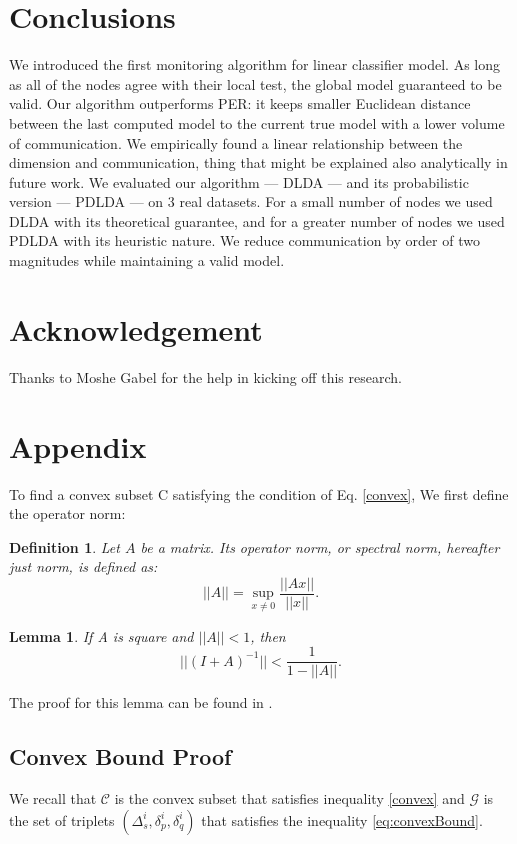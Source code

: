 \documentclass[11pt,twocolumn,varwidth=true,a4paper,fleqn]{article}
\newtheorem{lemma}{Lemma}
\newtheorem{definition}{Definition}
\begin{document}
\section*{Conclusions}
We introduced the first monitoring algorithm for linear classifier model.
As long as all of the nodes agree with their local test, the
global model guaranteed to be valid. 
Our algorithm outperforms PER: it keeps smaller Euclidean distance between 
the last computed model to the current true model with a lower volume of
communication. 
We empirically found a linear relationship between the dimension and
communication, thing that might be explained also analytically 
in future work. 
We evaluated our algorithm --- DLDA --- and its probabilistic version --- PDLDA --- on 3 real datasets. For a small number of nodes we used 
DLDA with its theoretical guarantee, and for a greater number of nodes we used
PDLDA with its heuristic nature.
We reduce communication by order of two magnitudes while maintaining a 
valid model.
 \section*{Acknowledgement}
Thanks to Moshe Gabel for the help in kicking off this research.




\appendix
\section{Appendix} \label{AppendixA}
To find a convex subset C satisfying the condition of Eq. \ref{convex},
We first define the operator norm:
\begin{definition}
Let $A$ be a matrix. Its operator norm, or
spectral norm, hereafter just norm, is defined as:
\begin{equation*}
||A|| = \sup_{x \neq 0}\frac{||Ax||}{||x||}.
\end{equation*}
\end{definition}

\begin{lemma} \label{lemma:newman}
If A is square and $||A|| < 1$, then
\begin{equation*}
||(I+A)^{-1}|| < \frac{1}{1-||A||}.
\end{equation*}
\end{lemma}
The proof for this lemma can be found in \cite{gabel2015monitoring}.

\subsection{Convex Bound Proof}
We recall that $\mathcal{C}$ is the convex subset that satisfies 
inequality \ref{convex} and $\mathcal{G}$ is the set of triplets 
$(\Delta_s^i, \delta_p^i, \delta_q^i)$
 that satisfies the inequality \ref{eq:convexBound}.
\end{document}
